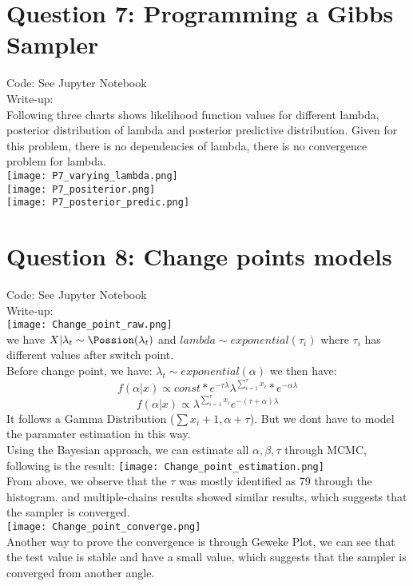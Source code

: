 \documentclass{article}
\begin{document}
\begin{enumerate}
\section{Question 7: Programming a Gibbs Sampler }
Code: See Jupyter Notebook \\
Write-up: \\
Following three charts shows likelihood function values for different lambda, posterior distribution of lambda and posterior predictive distribution. Given for this problem, there is no dependencies of lambda, there is no convergence problem for lambda.\\ 
\texttt{[image: P7\_varying\_lambda.png]}\\
\texttt{[image: P7\_positerior.png]}\\
\texttt{[image: P7\_posterior\_predic.png]}\\


\section{Question 8: Change points models} 
Code: See Jupyter Notebook \\
Write-up: \\
\texttt{[image: Change\_point\_raw.png]}\\

we have $X|\lambda _t \sim \Possion(\lambda_t)$ and $lambda \sim exponential (\tau_i)$ where $\tau_i$ has different values after switch point. \\
Before change point, we have: $\lambda_t \sim exponential(\alpha)$
we then have: 
$$f(\alpha|x) \propto const * e^{-\tau \lambda}\lambda^{\sum _{i=1}^{\tau}x_i}*e^{-\alpha \lambda} $$
$$f(\alpha|x) \propto \lambda^{\sum _{i=1}^{\tau}x_i}e^{-(\tau+\alpha)\lambda} $$
It follows a Gamma Distribution ($\sum x_i+1, \alpha+\tau$). But we dont have to model the paramater estimation in this way. \\ 
Using the Bayesian approach, we can estimate all $\alpha, \beta, \tau$ through MCMC, following is the result: 
\texttt{[image: Change\_point\_estimation.png]}\\
From above, we observe that the $\tau$ was mostly identified as 79 through the histogram. and multiple-chains results showed similar results, which suggests that the sampler is converged. \\
\texttt{[image: Change\_point\_converge.png]}\\
Another way to prove the convergence is through Geweke Plot, we can see that the test value is stable and have a small value, which suggests that the sampler is converged from another angle.





\end{enumerate}
\end{document}
